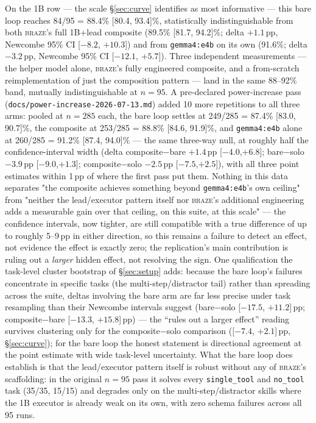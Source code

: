 \documentclass[smallcondensed,natbib]{svjour3}
\newcommand{\braze}{\textsc{braze}}
\begin{document}
On the 1B row --- the scale \S\ref{sec:curve} identifies as most
informative --- this bare loop reaches 84/95 = 88.4\% [80.4, 93.4]\%,
statistically indistinguishable from both \braze{}'s full 1B+lead
composite (89.5\% [81.7, 94.2]\%; delta $+1.1$\,pp, Newcombe 95\% CI
[$-8.2$, $+10.3$]) and from \texttt{gemma4:e4b} on its own
(91.6\%; delta $-3.2$\,pp, Newcombe 95\% CI [$-12.1$, $+5.7$]). Three
independent measurements --- the helper model alone, \braze{}'s fully
engineered composite, and a from-scratch reimplementation of just the
composition pattern --- land in the same 88--92\% band, mutually
indistinguishable at $n{=}95$. A pre-declared power-increase pass
(\texttt{docs/power-increase-2026-07-13.md}) added 10 more repetitions
to all three arms: pooled at $n{=}285$ each, the bare loop settles at
249/285 = 87.4\% [83.0, 90.7]\%, the composite at 253/285 = 88.8\%
[84.6, 91.9]\%, and \texttt{gemma4:e4b} alone at 260/285 = 91.2\%
[87.4, 94.0]\% --- the same three-way null, at roughly half the
confidence-interval width (delta composite$-$bare $+1.4$\,pp
[$-4.0$,$+6.8$]; bare$-$solo $-3.9$\,pp [$-9.0$,$+1.3$]; composite$-$solo
$-2.5$\,pp [$-7.5$,$+2.5$]), with all three point estimates within
1\,pp of where the first pass put them. Nothing in this data separates "the
composite achieves something beyond \texttt{gemma4:e4b}'s own ceiling"
from "neither the lead/executor pattern itself nor \braze{}'s
additional engineering adds a measurable gain over that ceiling, on
this suite, at this scale" --- the confidence
intervals, now tighter, are still compatible with a true difference of up
to roughly 5--9\,pp in either direction, so this remains a failure to detect
an effect, not evidence the effect is exactly zero; the replication's
main contribution is ruling out a \emph{larger} hidden effect, not
resolving the sign. One qualification the task-level cluster bootstrap
of \S\ref{sec:setup} adds: because the bare loop's failures concentrate
in specific tasks (the multi-step/distractor tail) rather than
spreading across the suite, deltas involving the bare arm are far less
precise under task resampling than their Newcombe intervals suggest
(bare$-$solo [$-17.5$, $+11.2$]\,pp; composite$-$bare [$-13.3$,
$+15.8$]\,pp) --- the ``rules out a larger effect'' reading survives
clustering only for the composite$-$solo comparison ([$-7.4$,
$+2.1$]\,pp, \S\ref{sec:curve}); for the bare loop the honest statement
is directional agreement at the point estimate with wide task-level
uncertainty. What the bare loop
does establish is that the lead/executor pattern itself is robust
without any of \braze{}'s scaffolding: in the original $n{=}95$ pass it
solves every \texttt{single\_tool} and \texttt{no\_tool} task (35/35,
15/15) and degrades only on the multi-step/distractor skills where the
1B executor is already weak on its own, with zero schema failures
across all 95 runs.
\end{document}
